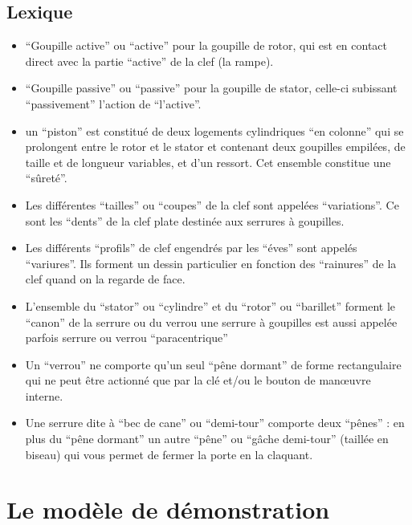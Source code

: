 \documentclass[a4paper,french,11pt,twoside]{report}
\begin{document}
\section*{Lexique}

\begin{itemize}
	\item{\enquote{Goupille active} ou \enquote{active} pour la goupille de rotor, qui est en contact direct avec la partie \enquote{active} de la clef (la rampe).}
	\item{\enquote{Goupille passive} ou \enquote{passive} pour la goupille de stator, celle-ci subissant \enquote{passivement} l'action de \enquote{l'active}.}
	\item{un \enquote{piston} est constitué de deux logements cylindriques \enquote{en colonne} qui se prolongent entre le rotor et le stator et contenant deux goupilles empilées, de taille et de longueur variables, et d'un ressort. Cet ensemble constitue une \enquote{sûreté}.}
	\item{Les différentes \enquote{tailles} ou \enquote{coupes} de la clef sont appelées \enquote{variations}. Ce sont les \enquote{dents} de la clef plate destinée aux serrures à goupilles.}
	\item{Les différents \enquote{profils} de clef engendrés par les \enquote{éves} sont appelés \enquote{variures}. Ils forment un dessin particulier en fonction des \enquote{rainures} de la clef quand on la regarde de face.}
	\item{L'ensemble du \enquote{stator} ou \enquote{cylindre} et du \enquote{rotor} ou \enquote{barillet} forment le \enquote{canon} de la serrure ou du verrou
une serrure à goupilles est aussi appelée parfois serrure ou verrou \enquote{paracentrique}}
	\item{Un \enquote{verrou} ne comporte qu'un seul \enquote{pêne dormant} de forme rectangulaire qui ne peut être actionné que par la clé et/ou le bouton de manœuvre interne.}
	\item{Une serrure dite à \enquote{bec de cane} ou \enquote{demi-tour} comporte deux \enquote{pênes} : en plus du \enquote{pêne dormant} un autre \enquote{pêne} ou \enquote{gâche demi-tour} (taillée en biseau) qui vous permet de fermer la porte en la claquant.}
\end{itemize}


\chapter{\label{chap:modele_demonstration}Le modèle de démonstration}
\end{document}
